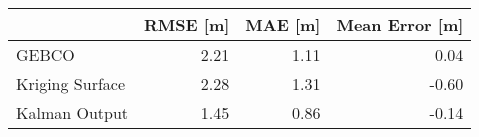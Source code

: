 
\begin{tabular}{lrrr}
\toprule
 & RMSE [m] & MAE [m] & Mean Error [m] \\
\midrule
GEBCO & 2.21 & 1.11 & 0.04 \\
Kriging Surface & 2.28 & 1.31 & -0.60 \\
Kalman Output & 1.45 & 0.86 & -0.14 \\
\bottomrule
\end{tabular}

